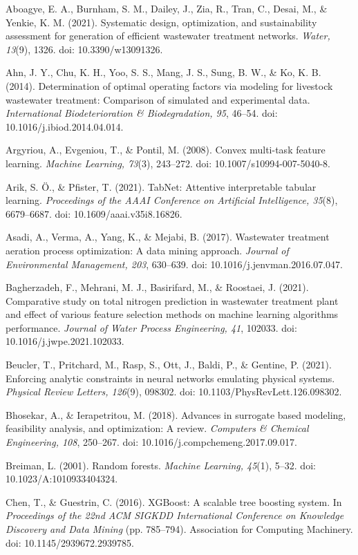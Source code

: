 \documentclass[a4paper,fleqn]{cas-sc}
\begin{document}
\noindent Aboagye, E. A., Burnham, S. M., Dailey, J., Zia, R., Tran, C., Desai, M., \& Yenkie, K. M. (2021). Systematic design, optimization, and sustainability assessment for generation of efficient wastewater treatment networks. \textit{Water, 13}(9), 1326. doi: 10.3390/w13091326.

\noindent Ahn, J. Y., Chu, K. H., Yoo, S. S., Mang, J. S., Sung, B. W., \& Ko, K. B. (2014). Determination of optimal operating factors via modeling for livestock wastewater treatment: Comparison of simulated and experimental data. \textit{International Biodeterioration \& Biodegradation, 95}, 46--54. doi: 10.1016/j.ibiod.2014.04.014.

\noindent Argyriou, A., Evgeniou, T., \& Pontil, M. (2008). Convex multi-task feature learning. \textit{Machine Learning, 73}(3), 243--272. doi: 10.1007/s10994-007-5040-8.

\noindent Arik, S. \"O., \& Pfister, T. (2021). TabNet: Attentive interpretable tabular learning. \textit{Proceedings of the AAAI Conference on Artificial Intelligence, 35}(8), 6679--6687. doi: 10.1609/aaai.v35i8.16826.

\noindent Asadi, A., Verma, A., Yang, K., \& Mejabi, B. (2017). Wastewater treatment aeration process optimization: A data mining approach. \textit{Journal of Environmental Management, 203}, 630--639. doi: 10.1016/j.jenvman.2016.07.047.

\noindent Bagherzadeh, F., Mehrani, M. J., Basirifard, M., \& Roostaei, J. (2021). Comparative study on total nitrogen prediction in wastewater treatment plant and effect of various feature selection methods on machine learning algorithms performance. \textit{Journal of Water Process Engineering, 41}, 102033. doi: 10.1016/j.jwpe.2021.102033.

\noindent Beucler, T., Pritchard, M., Rasp, S., Ott, J., Baldi, P., \& Gentine, P. (2021). Enforcing analytic constraints in neural networks emulating physical systems. \textit{Physical Review Letters, 126}(9), 098302. doi: 10.1103/PhysRevLett.126.098302.

\noindent Bhosekar, A., \& Ierapetritou, M. (2018). Advances in surrogate based modeling, feasibility analysis, and optimization: A review. \textit{Computers \& Chemical Engineering, 108}, 250--267. doi: 10.1016/j.compchemeng.2017.09.017.

\noindent Breiman, L. (2001). Random forests. \textit{Machine Learning, 45}(1), 5--32. doi: 10.1023/A:1010933404324.

\noindent Chen, T., \& Guestrin, C. (2016). XGBoost: A scalable tree boosting system. In \textit{Proceedings of the 22nd ACM SIGKDD International Conference on Knowledge Discovery and Data Mining} (pp. 785--794). Association for Computing Machinery. doi: 10.1145/2939672.2939785.
\end{document}
